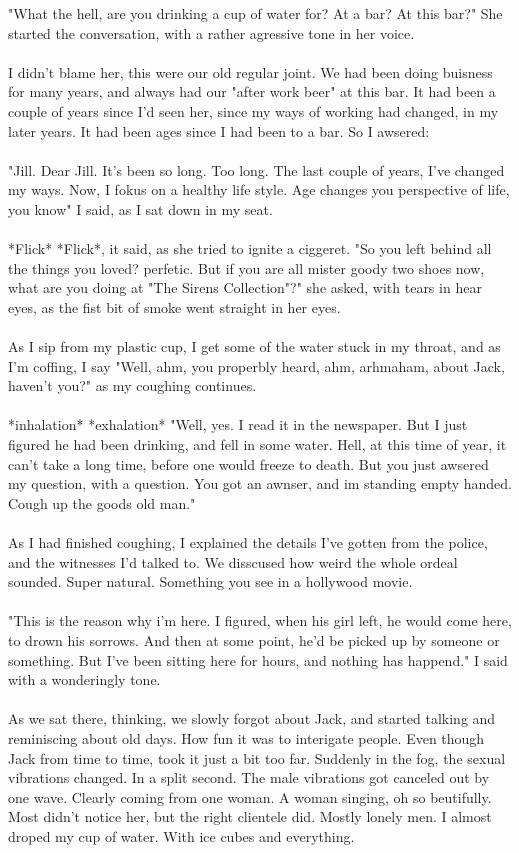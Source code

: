 \documentclass[]{article}
\begin{document}
"What the hell, are you drinking a cup of water for? At a bar? At this bar?" She started the conversation, with a rather agressive tone in her voice.
\\ \\
I didn't blame her, this were our old regular joint. We had been doing buisness for many years, and always had our "after work beer" at this bar. It had been a couple of years since I'd seen her, since my ways of working had changed, in my later years. It had been ages since I had been to a bar. So I awsered:
\\ \\
"Jill. Dear Jill. It's been so long. Too long. The last couple of years, I've changed my ways. Now, I fokus on a healthy life style. Age changes you perspective of life, you know" I said, as I sat down in my seat.
\\ \\
*Flick* *Flick*, it said, as she tried to ignite a ciggeret. "So you left behind all the things you loved? perfetic. But if you are all mister goody two shoes now, what are you doing at "The Sirens Collection"?" she asked, with tears in hear eyes, as the fist bit of smoke went straight in her eyes.
\\ \\
As I sip from my plastic cup, I get some of the water stuck in my throat, and as I'm coffing, I say "Well, ahm, you properbly heard, ahm, arhmaham, about Jack, haven't you?" as my coughing continues.
\\ \\
*inhalation* *exhalation* "Well, yes. I read it in the newspaper. But I just figured he had been drinking, and fell in some water. Hell, at this time of year, it can't take a long time, before one would freeze to death. But you just awsered my question, with a question. You got an awnser, and im standing empty handed. Cough up the goods old man."
\\ \\
As I had finished coughing, I explained the details I've gotten from the police, and the witnesses I'd talked to. We disscused how weird the whole ordeal sounded. Super natural. Something you see in a hollywood movie.
\\ \\
"This is the reason why i'm here. I figured, when his girl left, he would come here, to drown his sorrows. And then at some point, he'd be picked up by someone or something. But I've been sitting here for hours, and nothing has happend." I said with a wonderingly tone. 
\\ \\
As we sat there, thinking, we slowly forgot about Jack, and started talking and reminiscing about old days. How fun it was to interigate people. Even though Jack from time to time, took it just a bit too far. Suddenly in the fog, the sexual vibrations changed. In a split second. The male vibrations got canceled out by one wave. Clearly coming from one woman. A woman singing, oh so beutifully. Most didn't notice her, but the right clientele did. Mostly lonely men. I almost droped my cup of water. With ice cubes and everything.
\end{document}
